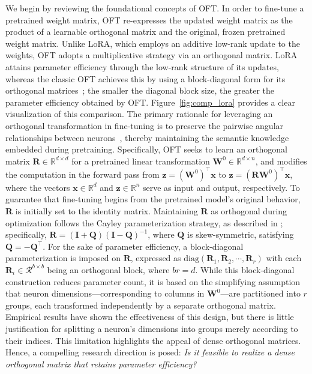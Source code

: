 We begin by reviewing the foundational concepts of OFT. In order to fine-tune a pretrained weight matrix, OFT re-expresses the updated weight matrix as the product of a learnable orthogonal matrix and the original, frozen pretrained weight matrix. Unlike LoRA, which employs an additive low-rank update to the weights, OFT adopts a multiplicative strategy via an orthogonal matrix. LoRA attains parameter efficiency through the low-rank structure of its updates, whereas the classic OFT achieves this by using a block-diagonal form for its orthogonal matrices~\cite{qiu2023controlling}; the smaller the diagonal block size, the greater the parameter efficiency obtained by OFT. Figure~\ref{fig:comp_lora} provides a clear visualization of this comparison. The primary rationale for leveraging an orthogonal transformation in fine-tuning is to preserve the pairwise angular relationships between neurons~\cite{liu2018learning,liu2021orthogonal,qiu2023controlling}, thereby maintaining the semantic knowledge embedded during pretraining. Specifically, OFT seeks to learn an orthogonal matrix $\bm{R}\in\mathbb{R}^{d\times d}$ for a pretrained linear transformation $\bm{W}^0\in\mathbb{R}^{d\times n}$, and modifies the computation in the forward pass from $\bm{z}=(\bm{W}^0)^\top\bm{x}$ to $\bm{z}=(\bm{R}\bm{W}^0)^\top\bm{x}$, where the vectors $\bm{x}\in\mathbb{R}^{d}$ and $\bm{z}\in\mathbb{R}^{n}$ serve as input and output, respectively. To guarantee that fine-tuning begins from the pretrained model’s original behavior, $\bm{R}$ is initially set to the identity matrix. Maintaining $\bm{R}$ as orthogonal during optimization follows the Cayley parameterization strategy, as described in \cite{qiu2023controlling,liu2021orthogonal}; specifically, $\bm{R}=(\bm{I}+\bm{Q})(\bm{I}-\bm{Q})^{-1}$, where $\bm{Q}$ is skew-symmetric, satisfying $\bm{Q}=-\bm{Q}^\top$. For the sake of parameter efficiency, a block-diagonal parameterization is imposed on $\bm{R}$, expressed as $\text{diag}(\bm{R}_1,\bm{R}_2,\cdots,\bm{R}_r)$ with each $\bm{R}_i\in\mathcal{R}^{b\times b}$ being an orthogonal block, where $br=d$. While this block-diagonal construction reduces parameter count, it is based on the simplifying assumption that neuron dimensions—corresponding to columns in $\bm{W}^0$—are partitioned into $r$ groups, each transformed independently by a separate orthogonal matrix. Empirical results have shown the effectiveness of this design, but there is little justification for splitting a neuron’s dimensions into groups merely according to their indices. This limitation highlights the appeal of dense orthogonal matrices. Hence, a compelling research direction is posed: \emph{Is it feasible to realize a dense orthogonal matrix that retains parameter efficiency?}

